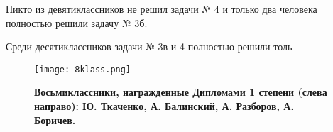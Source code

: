 \begin{minipage}[10cm]{\textwidth}
\begin{multicols*}{2}
Никто из девятиклассников не решил задачи № 4 и только два человека полностью решили задачу № 3б.
    
Среди десятиклассников задачи № 3в и 4 полностью решили толь-
    \end{multicols*}
\end{minipage}

\begin{SCfigure}[][h] %
	\caption*{\textbf{Восьмиклассники, награжденные Дипломами 1 степени (слева направо): Ю. Ткаченко, А. Балинский, А. Разборов, А. Боричев.}} %
	\texttt{[image: 8klass.png]}
\end{SCfigure}